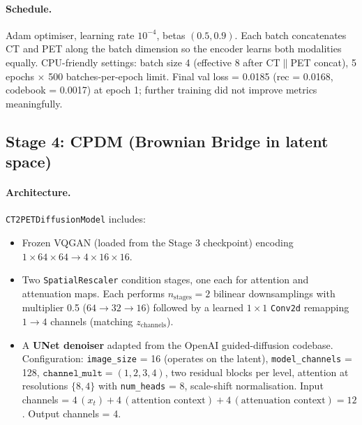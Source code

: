 \documentclass[11pt,a4paper]{article}
\begin{document}
\paragraph{Schedule.} Adam optimiser, learning rate $10^{-4}$, betas $(0.5, 0.9)$. Each batch concatenates CT and PET along the batch dimension so the encoder learns both modalities equally. CPU-friendly settings: batch size 4 (effective 8 after CT$\|$PET concat), 5 epochs $\times$ 500 batches-per-epoch limit. Final val loss = 0.0185 (rec = 0.0168, codebook = 0.0017) at epoch 1; further training did not improve metrics meaningfully.

\subsection{Stage 4: CPDM (Brownian Bridge in latent space)}

\paragraph{Architecture.} \texttt{CT2PETDiffusionModel} includes:
\begin{itemize}
  \item Frozen VQGAN (loaded from the Stage 3 checkpoint) encoding 
  $1 \times 64 \times 64 \to 4 \times 16 \times 16$.
  \item Two \texttt{SpatialRescaler} condition stages, one each for 
  attention and attenuation maps. Each performs $n_{\text{stages}} = 2$ 
  bilinear downsamplings with multiplier 0.5 ($64 \to 32 \to 16$) followed by a 
  learned $1 \times 1$ \texttt{Conv2d} remapping $1 \to 4$ channels 
  (matching $z_{\text{channels}}$).
  \item A \textbf{UNet denoiser} \parencite{ronneberger2015unet, ho2020denoising} 
  adapted from the OpenAI guided-diffusion codebase. Configuration: 
  \texttt{image\_size} = 16 (operates on the latent), \texttt{model\_channels} = 128,
  $\texttt{channel\_mult} = (1, 2, 3, 4)$, two residual blocks per level, attention 
  at resolutions $\{8, 4\}$ with \texttt{num\_heads} = 8, scale-shift normalisation. 
  Input channels = $4\,(x_t) + 4\,(\text{attention context}) + 4\,(\text{attenuation context}) = 12$.
  Output channels = 4.
\end{itemize}
\end{document}
